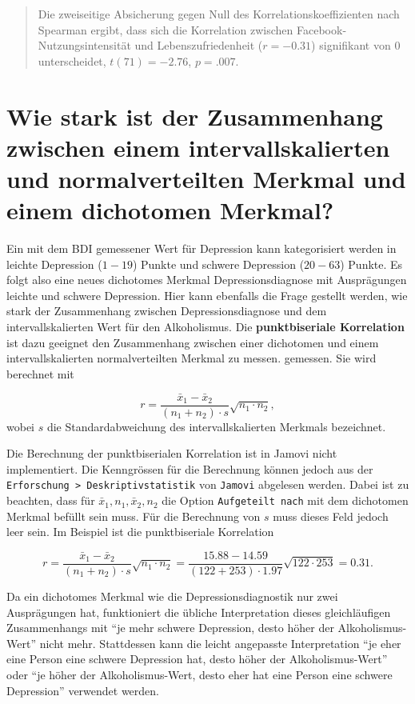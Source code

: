 \documentclass[
]{book}
\theoremstyle{definition}
\theoremstyle{definition}
\theoremstyle{definition}
\theoremstyle{definition}
\theoremstyle{remark}
\begin{document}
\begin{quote}
Die zweiseitige Absicherung gegen Null des Korrelationskoeffizienten nach Spearman ergibt, dass sich die Korrelation zwischen Facebook-Nutzungsintensität und Lebenszufriedenheit (\(r = -0.31\)) signifikant von \(0\) unterscheidet, \(t(71) = -2.76\), \(p = .007\).
\end{quote}

\section{Wie stark ist der Zusammenhang zwischen einem intervallskalierten und normalverteilten Merkmal und einem dichotomen Merkmal?}\label{wie-stark-ist-der-zusammenhang-zwischen-einem-intervallskalierten-und-normalverteilten-merkmal-und-einem-dichotomen-merkmal}

Ein mit dem BDI gemessener Wert für Depression kann kategorisiert werden in leichte Depression (\(1-19\)) Punkte und schwere Depression (\(20-63\)) Punkte. Es folgt also eine neues dichotomes Merkmal Depressionsdiagnose mit Ausprägungen leichte und schwere Depression. Hier kann ebenfalls die Frage gestellt werden, wie stark der Zusammenhang zwischen Depressionsdiagnose und dem intervallskalierten Wert für den Alkoholismus. \label{customdef-punktbiseriale-korrelation}{Die \textbf{punktbiseriale Korrelation} ist dazu geeignet den Zusammenhang zwischen einer dichotomen und einem intervallskalierten normalverteilten Merkmal zu messen.} gemessen. Sie wird berechnet mit

\[ r = \frac{\bar{x}_1- \bar{x}_2}{(n_1+n_2)\cdot s}\sqrt{n_1\cdot n_2},\]
wobei \(s\) die Standardabweichung des intervallskalierten Merkmals bezeichnet.

Die Berechnung der punktbiserialen Korrelation ist in Jamovi nicht implementiert. Die Kenngrössen für die Berechnung können jedoch aus der \texttt{Erforschung\ \textgreater{}\ Deskriptivstatistik} von \texttt{Jamovi} abgelesen werden. Dabei ist zu beachten, dass für \(\bar{x}_1, n_1, \bar{x}_2, n_2\) die Option \texttt{Aufgeteilt\ nach} mit dem dichotomen Merkmal befüllt sein muss. Für die Berechnung von \(s\) muss dieses Feld jedoch leer sein. Im Beispiel ist die punktbiseriale Korrelation

\[ r = \frac{\bar{x}_1- \bar{x}_2}{(n_1+n_2)\cdot s}\sqrt{n_1\cdot n_2}
= \frac{15.88- 14.59}{(122+253)\cdot 1.97}\sqrt{122\cdot 253} = 0.31.\]

Da ein dichotomes Merkmal wie die Depressionsdiagnostik nur zwei Ausprägungen hat, funktioniert die übliche Interpretation dieses gleichläufigen Zusammenhangs mit ``je mehr schwere Depression, desto höher der Alkoholismus-Wert'' nicht mehr. Stattdessen kann die leicht angepasste Interpretation ``je eher eine Person eine schwere Depression hat, desto höher der Alkoholismus-Wert'' oder ``je höher der Alkoholismus-Wert, desto eher hat eine Person eine schwere Depression'' verwendet werden.
\end{document}
